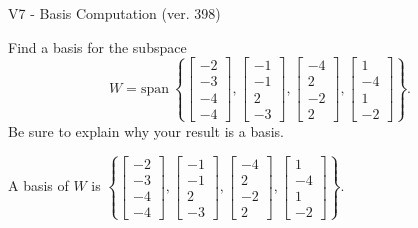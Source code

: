 \begin{exercise}
  \begin{exerciseTitle}V7 - Basis Computation (ver. 398)\end{exerciseTitle}
  \begin{exerciseStatement}
    Find a basis for the subspace 
\[W=\mathrm{span}\ \left\{\left[\begin{array}{r}
-2 \\
-3 \\
-4 \\
-4
\end{array}\right] , \left[\begin{array}{r}
-1 \\
-1 \\
2 \\
-3
\end{array}\right] , \left[\begin{array}{r}
-4 \\
2 \\
-2 \\
2
\end{array}\right] , \left[\begin{array}{r}
1 \\
-4 \\
1 \\
-2
\end{array}\right]\right\}.\]
 Be sure to explain why your result is a basis.


  \end{exerciseStatement}
  \begin{exerciseAnswer}
   A basis of \(W\) is  \(\left\{\left[\begin{array}{r}
-2 \\
-3 \\
-4 \\
-4
\end{array}\right] , \left[\begin{array}{r}
-1 \\
-1 \\
2 \\
-3
\end{array}\right] , \left[\begin{array}{r}
-4 \\
2 \\
-2 \\
2
\end{array}\right] , \left[\begin{array}{r}
1 \\
-4 \\
1 \\
-2
\end{array}\right]\right\}\).
  


  \end{exerciseAnswer}
\end{exercise}